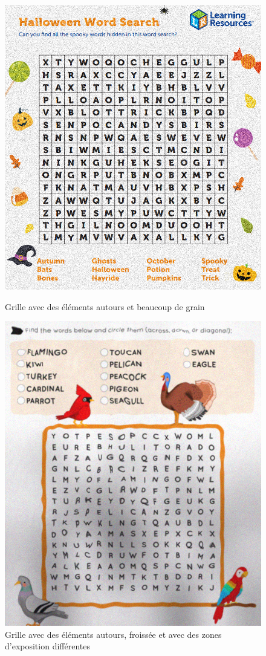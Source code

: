 \documentclass{article}
\begin{document}
\begin{figure}[!htb]
      \includegraphics[width=\linewidth]{ressources/image_2.png}
      \caption{Grille avec des éléments autours et beaucoup de grain}
    \endminipage\hfill
      \includegraphics[width=\linewidth]{ressources/image_3.png}
      \caption{Grille avec des éléments autours, froissée et avec des zones d'exposition différentes}
    \endminipage
\end{figure}
\end{document}
